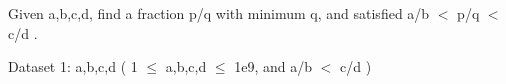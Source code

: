 Given a,b,c,d, find a fraction p/q with minimum q, and satisfied a/b $<$ p/q $<$ c/d .  

Dataset 1: a,b,c,d ( 1  $\le$  a,b,c,d  $\le$  1e9, and a/b $<$ c/d )